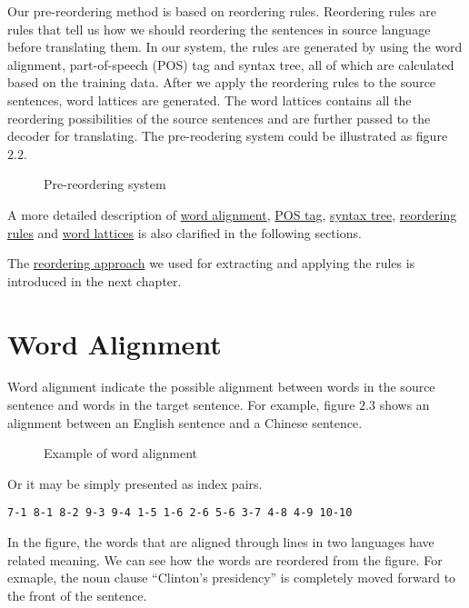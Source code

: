Our pre-reordering method is based on reordering rules. Reordering rules are rules that tell us how we should reordering the sentences in source language before translating them. In our system, the rules are generated by using the word alignment, part-of-speech (POS) tag and syntax tree, all of which are calculated based on the training data. After we apply the reordering rules to the source sentences, word lattices are generated. The word lattices contains all the reordering possibilities of the source sentences and are further passed to the decoder for translating. The pre-reodering system could be illustrated as figure $2.2$.

\begin{figure}[H]
\centering

\caption{Pre-reordering system}
\end{figure}

A more detailed description of \hyperref[ch:Foundations:sec:Alignment]{word alignment}, \hyperref[ch:Foundations:sec:PosTag]{POS tag}, \hyperref[ch:Foundations:sec:SyntacticTree]{syntax tree},
\hyperref[ch:Foundations:sec:types]{reordering rules} and 
\hyperref[ch:Foundations:sec:Lattices]{word lattices} is also clarified in the following sections.

The \hyperref[ch:ReorderingApproach]{reordering approach} we used for extracting and applying the rules is introduced in the next chapter.

\section{Word Alignment}
\label{ch:Foundations:sec:Alignment}

Word alignment indicate the possible alignment between words in the source sentence and words in the target sentence. For example, figure $2.3$ shows an alignment between an English sentence and a Chinese sentence.

\begin{figure}[H]
\centering

\caption{Example of word alignment}
\end{figure}
Or it may be simply presented as index pairs.
\begin{center}
\verb|7-1 8-1 8-2 9-3 9-4 1-5 1-6 2-6 5-6 3-7 4-8 4-9 10-10|
\end{center}

In the figure, the words that are aligned through lines in two languages have related meaning. We can see how the words are reordered from the figure. For exmaple, the noun clause ``Clinton's presidency'' is completely moved forward to the front of the sentence.

